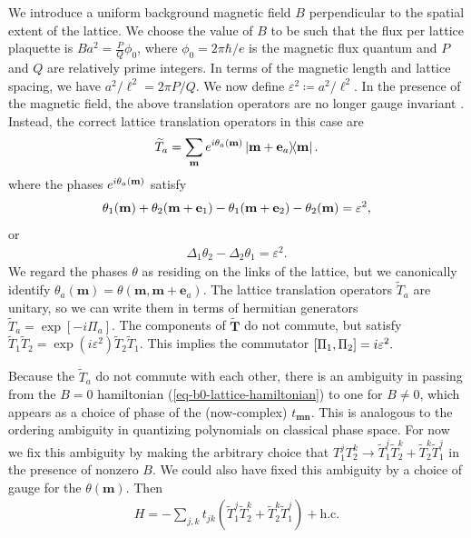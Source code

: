 \documentclass[aps,prb,twocolumn,letterpaper,twoside,nobalancelastpage,groupedaddress,amsmath,amssymb,floatfix,citeautoscript]{revtex4-1}
\begin{document}
We introduce a uniform background magnetic field $B$ perpendicular to the spatial extent of the lattice. We choose the value of $B$ to be such that the flux per lattice plaquette is $Ba^2 = \frac{P}{Q}\phi_0$, where $\phi_0 = 2\pi \hbar /e$ is the magnetic flux quantum and $P$ and $Q$ are relatively prime integers. In terms of the magnetic length and lattice spacing, we have $a^2/\ell^2 = 2 \pi P/Q$. We now define $\varepsilon^2 \coloneqq a^2/\ell^2$. In the presence of the magnetic field, the above translation operators are no longer gauge invariant \cite{FradkinBook}. Instead, the correct lattice translation operators in this case are
\begin{align*}
\widetilde{T}_a = \sum_{\mathbf{m}} e^{i\theta_a(\mathbf{m})} \dyad{\bfm + \mathbf{e}_a}{\bfm}.
\end{align*}
where the phases $e^{i\theta_a(\mathbf{m})}$ satisfy 
\begin{align*}
\theta_1(\mathbf{m}) + \theta_2(\mathbf{m} + \mathbf{e}_1) - \theta_1(\mathbf{m} + \mathbf{e}_2) - \theta_2(\mathbf{m}) = \varepsilon^2,
\end{align*}
or
\begin{align*}
\Delta_1\theta_2 - \Delta_2\theta_1 = \varepsilon^2.
\end{align*}
We regard the phases $\theta$ as residing on the links of the lattice, but we canonically identify $\theta_a(\mathbf{m}) = \theta(\mathbf{m},\mathbf{m}+\mathbf{e}_a)$.
The lattice translation operators $\widetilde{T}_a$ are unitary, so we can write them in terms of hermitian generators $\widetilde{T}_a = \exp\left[-i \Pi_a\right]$. The components of $\widetilde{\mathbf{T}}$ do not commute, but satisfy $\widetilde{T}_1 \widetilde{T}_2 = \exp(i\varepsilon^2) \widetilde{T}_2 \widetilde{T}_1 $. This implies the commutator
$\comm{\Pi_1}{\Pi_2} = i \varepsilon^2.$


Because the $\widetilde{T}_a$ do not commute with each other, there is an ambiguity in passing from the $B=0$ hamiltonian (\ref{eq-b0-lattice-hamiltonian}) to one for $B\neq0$, which appears as a choice of phase of the (now-complex) $t_{\mathbf{m}\mathbf{n}}$. This is analogous to the ordering ambiguity in quantizing polynomials on classical phase space. For now we fix this ambiguity by making the arbitrary choice that $T_1^j T_2^k \rightarrow \widetilde{T}_1^j \widetilde{T}_2^k + \widetilde{T}_2^k\widetilde{T}_1^j$ in the presence of nonzero $B$. We could also have fixed this ambiguity by a choice of gauge for the $\theta(\mathbf{m})$. Then
\begin{align*}
H = -\sum_{j,k} t_{jk}\left(\widetilde{T}_1^j \widetilde{T}_2^k + \widetilde{T}_2^k\widetilde{T}_1^j\right) + \text{h.c.}
\end{align*}
\end{document}

